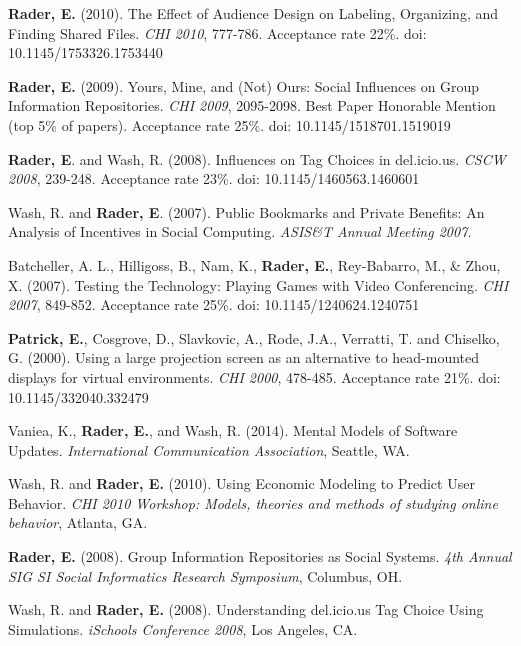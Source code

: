 \documentclass[9pt]{extarticle}
\makeatletter
\renewcommand{\section}{%
  \@startsection{section}{1}{0em}{\baselineskip}{3pt}{\large\bfseries\textsc}}
\makeatother
\begin{document}
\textbf{Rader, E.} (2010). The Effect of Audience Design on Labeling, Organizing, and Finding Shared Files. \emph{CHI 2010}, 777-786. Acceptance rate 22\%. doi: 10.1145/1753326.1753440

\textbf{Rader, E.} (2009). Yours, Mine, and (Not) Ours: Social Influences on Group Information Repositories. \emph{CHI 2009}, 2095-2098. Best Paper Honorable Mention (top 5\% of papers). Acceptance rate 25\%. doi: 10.1145/1518701.1519019

\textbf{Rader, E}. and Wash, R. (2008). Influences on Tag Choices in del.icio.us. \emph{CSCW 2008}, 239-248. Acceptance rate 23\%. doi: 10.1145/1460563.1460601

Wash, R. and \textbf{Rader, E}. (2007). Public Bookmarks and Private Benefits: An Analysis of Incentives in Social Computing. \emph{ASIS\&T Annual Meeting 2007.}

Batcheller, A. L., Hilligoss, B., Nam, K., \textbf{Rader, E.}, Rey-Babarro, M., \& Zhou, X. (2007). Testing the Technology: Playing Games with Video Conferencing. \emph{CHI 2007}, 849-852. Acceptance rate 25\%. doi: 10.1145/1240624.1240751

\textbf{Patrick, E.}, Cosgrove, D., Slavkovic, A., Rode, J.A., Verratti, T. and Chiselko, G. (2000). Using a large projection screen as an alternative to head-mounted displays for virtual environments. \emph{CHI 2000}, 478-485. Acceptance rate 21\%. doi: 10.1145/332040.332479



\section{Conference and Workshop Papers}

Vaniea, K., \textbf{Rader, E.}, and Wash, R. (2014). Mental Models of Software Updates. \emph{International Communication Association},  Seattle, WA.

Wash, R. and \textbf{Rader, E.} (2010). Using Economic Modeling to Predict User Behavior. \emph{CHI 2010 Workshop: Models, theories and methods of studying online behavior}, Atlanta, GA.

\textbf{Rader, E.} (2008). Group Information Repositories as Social Systems. \emph{4th Annual SIG SI Social Informatics Research Symposium}, Columbus, OH.

Wash, R. and \textbf{Rader, E.} (2008). Understanding del.icio.us Tag Choice Using Simulations. \emph{iSchools Conference 2008}, Los Angeles, CA.
\end{document}
